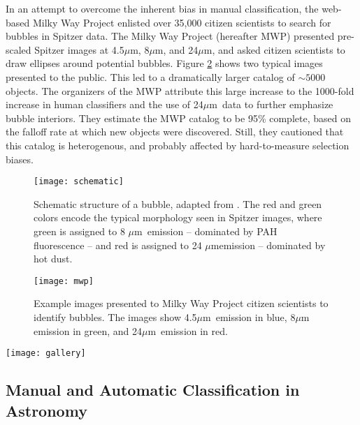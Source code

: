 \documentclass[preprint]{aastex}
\newcommand{\um}[0]{$\mu$m}
\newcommand{\hii}[0]{H$_{\rm II}$}
\begin{document}
In an attempt to overcome the inherent bias in manual classification, the web-based Milky Way Project \citep{Simpson12} enlisted over 35,000 citizen scientists to search for bubbles in Spitzer data. The Milky Way Project (hereafter MWP) presented pre-scaled Spitzer images at 4.5\um,  8\um, and 24\um, and asked citizen scientists to draw ellipses around potential bubbles. Figure \ref{fig:mwp} shows two typical images presented to the public. This led to a dramatically larger catalog of $\sim 5000$ objects. The organizers of the MWP attribute this large increase to the 1000-fold increase in human classifiers and the use of 24\um\, data to further emphasize bubble interiors. They estimate the MWP catalog to be 95\% complete, based on the falloff rate at which new objects were discovered. Still, they cautioned that this catalog is heterogenous, and probably affected by hard-to-measure selection biases. 

\begin{figure}[h!]
\texttt{[image: schematic]}
\caption{Schematic structure of a bubble, adapted from \citep{Freyer03}. The red and green colors encode the typical morphology seen in Spitzer images, where green is assigned to 8 \um\, emission -- dominated by PAH fluorescence -- and red is assigned to 24 \um emission -- dominated by hot dust.}
\label{fig:schematic}
\end{figure}

\begin{figure}[h!]
\texttt{[image: mwp]}
\caption{Example images presented to Milky Way Project citizen scientists to identify bubbles. The images show 4.5\um\, emission in blue,  8\um\, emission in green, and 24\um\, emission in red.}
\label{fig:mwp}
\end{figure}

\begin{figure*}
\texttt{[image: gallery]}
\caption{Different astrophysical objects in the MWP catalog. a) ``Canonical'' wind-blown bubbles and \hii\, regions. b) shells
without 8 \um\, PAH emission (likely supernovae and planetary nebulae). c) generic ISM structures of unclear astrophysical origin.}
\label{fig:gallery}
\end{figure*}

\subsection{Manual and Automatic Classification in Astronomy}
\label{sec:benefits}
\end{document}
